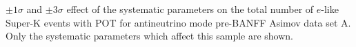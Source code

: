 \begin{table}
	\begin{adjustbox}{width=\textwidth, totalheight=\textheight, keepaspectratio}
		
	\end{adjustbox}
	\caption
	{
		$\pm1\sigma$ and $\pm3\sigma$ effect of the systematic parameters on the total number of $e$-like Super-K events with \RunPeriod POT for antineutrino mode pre-BANFF Asimov data set A. Only the systematic parameters which affect this sample are shown.
	}
\end{table}\clearpage